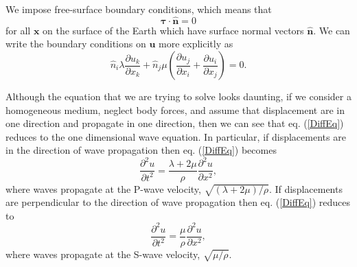 \documentclass[12pt]{article}
\begin{document}
We impose free-surface boundary conditions, which means that
\begin{equation}\label{BoundaryCondition}
  \boldsymbol{\tau}\cdot\boldsymbol{\hat{n}} = 0
\end{equation}
for all $\boldsymbol{x}$ on the surface of the Earth which have
surface normal vectors $\boldsymbol{\hat{n}}$.  We can write the
boundary conditions on $\boldsymbol{u}$ more explicitly as
\begin{equation}\label{BoundaryConditionExplicit}
  \hat{n}_i\lambda\frac{\partial u_k}{\partial x_k} +
  \hat{n}_j\mu\left(\frac{\partial u_j}{\partial x_i} +
  \frac{\partial u_i}{\partial x_j}\right) = 0.
\end{equation}

Although the equation that we are trying to solve looks daunting, if
we consider a homogeneous medium, neglect body forces, and assume
that displacement are in one direction and propagate in one direction,
then we can see that eq. (\ref{DiffEq}) reduces to the one dimensional
wave equation. In particular, if displacements are in the direction of
wave propagation then eq. (\ref{DiffEq}) becomes
\begin{equation}\label{1DS}
  \frac{\partial^2 u}{\partial t^2} = \frac{\lambda + 2\mu}{\rho}\frac{\partial^2 u}{\partial x^2},
\end{equation}
where waves propagate at the P-wave velocity, $\sqrt{(\lambda +
  2\mu)/\rho}$. If displacements are perpendicular to the direction of
wave propagation then eq. (\ref{DiffEq}) reduces to
\begin{equation}\label{1DP}
  \frac{\partial^2 u}{\partial t^2} = \frac{\mu}{\rho}\frac{\partial^2 u}{\partial x^2},
\end{equation}
where waves propagate at the S-wave velocity, $\sqrt{\mu/\rho}$.  
\end{document}
